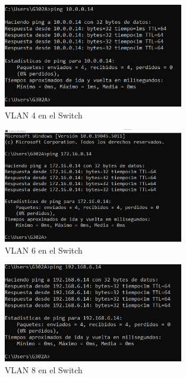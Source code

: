         \begin{figure}[H]
            \centering
            \includegraphics[width=0.7\textwidth]{img/ping_vlan4.png}
            \caption{VLAN 4 en el Switch}
            \label{fig:ping_vlan4}
        \end{figure}


        \begin{figure}[H]
            \centering
            \includegraphics[width=0.7\textwidth]{img/ping_vlan6.png}
            \caption{VLAN 6 en el Switch}
            \label{fig:ping_vlan6}
        \end{figure}

        \begin{figure}[H]
            \centering
            \includegraphics[width=0.7\textwidth]{img/ping_vlan8.png}
            \caption{VLAN 8 en el Switch}
            \label{fig:ping_vlan8}
        \end{figure}


